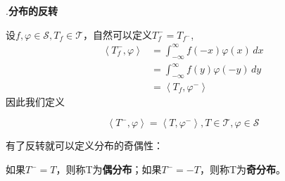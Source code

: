 .\textbf{分布的反转}

设$f,\varphi\in\mathcal{S} ,T_f\in\mathcal{T} $，自然可以定义$T_f^-=T_{f^-}$,
\begin{align*}
    \left\langle T_f^-,\varphi\right\rangle & =\int_{-\infty}^{\infty}f(-x)\varphi(x)\,dx \\
                                 & =\int_{-\infty}^{\infty}f(y)\varphi(-y)\,dy \\
                                 & =\left\langle T_f,\varphi^-\right\rangle
\end{align*}
因此我们定义\begin{definition}[分布的反转]
    \begin{equation*}
    \left\langle T^-,\varphi\right\rangle=\left\langle T,\varphi^-\right\rangle,T\in\mathcal{T} ,\varphi\in\mathcal{S}
\end{equation*}
\end{definition}

有了反转就可以定义分布的奇偶性：
\begin{definition}[分布的奇偶性]
    如果$T^-=T$，则称T为\textbf{偶分布}；如果$T^-=-T$，则称T为\textbf{奇分布}。
\end{definition}

